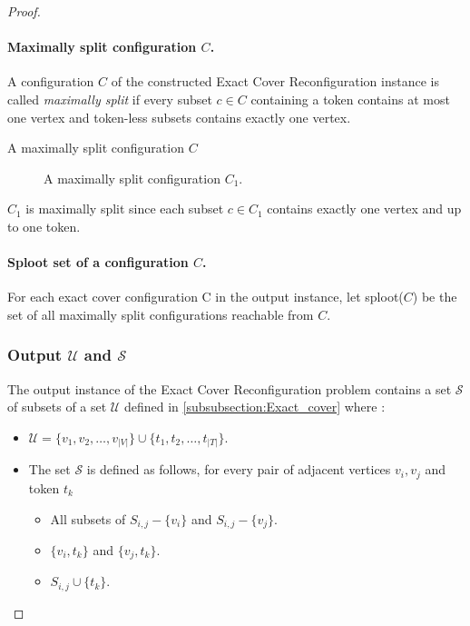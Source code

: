 \begin{proof}
\paragraph{Maximally split configuration $C$.}
A configuration $C$ of the constructed Exact Cover Reconfiguration instance is called \textit{maximally split} if every subset $c \in C$ containing a token
contains at most one vertex and token-less subsets contains exactly one vertex.
\begin{example}{A maximally split configuration $C$}
  \begin{figure}[h!]
    \begin{center}
      \begin{scaletikzpicturetowidth}{\textwidth}
      \end{scaletikzpicturetowidth}
    \end{center}
    \caption{A maximally split configuration $C_1$.}
    \label{}
  \end{figure}
  $C_1$ is maximally split since each subset $c \in C_1$ contains exactly one vertex and up to one token.
\end{example}

\paragraph{Sploot set of a configuration $C$.}
For each exact cover conﬁguration C in the output instance, let sploot($C$) be the set of all maximally split conﬁgurations reachable from $C$.


\subsubsection{Output $\mathcal{U}$ and $\mathcal{S}$}
The output instance of the Exact Cover Reconfiguration problem contains a set $\mathcal{S}$ of subsets of a set $\mathcal{U}$ defined in \ref{subsubsection:Exact_cover} where :
\begin{itemize}
  \item $\mathcal{U} = \{v_1, v_2, \dots, v_{|V|}\} \cup \{t_1, t_2, \dots, t_{|T|}\}.$
  \item The set $\mathcal{S}$ is defined as follows, for every pair of adjacent vertices $v_i, v_j$ and token $t_k$
    \begin{itemize}
      \item All subsets of $S_{i,j} - \{v_i\}$ and $S_{i,j} - \{v_j\}$.
      \item $\{v_i, t_k\}$ and $\{v_j , t_k\}$.
      \item $S_{i,j} \cup \{t_k\}$.
    \end{itemize}
\end{itemize}


\end{proof}
